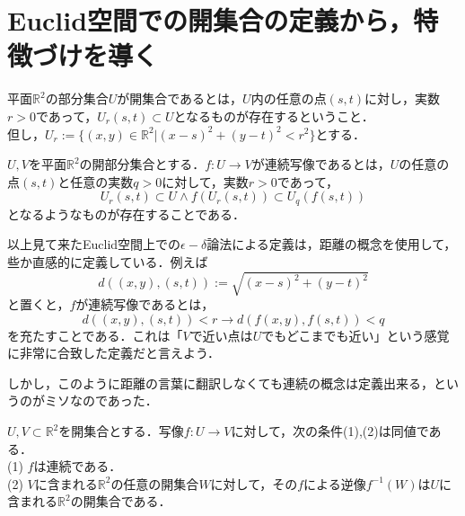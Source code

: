 \documentclass[uplatex, dvipdfmx]{jsreport}
\begin{document}
\section{Euclid空間での開集合の定義から，特徴づけを導く}

\begin{shadebox}\begin{definition}
    平面$\mathbb{R}^2$の部分集合$U$が開集合であるとは，$U$内の任意の点$(s,t)$に対し，実数$r>0$であって，$U_r(s,t)\subset U$となるものが存在するということ．\\
    但し，$U_r := \{ (x,y)\in\mathbb{R}^2 | (x-s)^2 + (y-t)^2 < r^2 \}$とする．
\end{definition}\end{shadebox}

\begin{shadebox}\begin{definition}
    $U,V$を平面$\mathbb{R}^2$の開部分集合とする．$f:U\rightarrow V$が連続写像であるとは，$U$の任意の点$(s,t)$と任意の実数$q>0$に対して，実数$r>0$であって，$$U_r(s,t)\subset U \wedge f(U_r(s,t))\subset U_q(f(s,t))$$となるようなものが存在することである．
\end{definition}\end{shadebox}

以上見て来たEuclid空間上での$\epsilon -\delta$論法による定義は，距離の概念を使用して，些か直感的に定義している．例えば$$d((x,y),(s,t)):=\sqrt{(x-s)^2+(y-t)^2}$$と置くと，$f$が連続写像であるとは，$$d((x,y),(s,t))<r\rightarrow d(f(x,y),f(s,t))<q$$を充たすことである．これは「$V$で近い点は$U$でもどこまでも近い」という感覚に非常に合致した定義だと言えよう．\par
しかし，このように距離の言葉に翻訳しなくても連続の概念は定義出来る，というのがミソなのであった．

\begin{shadebox}\begin{definition}[連続写像の特徴付け]
    $U,V\subset\mathbb{R}^2$を開集合とする．写像$f:U\rightarrow V$に対して，次の条件(1),(2)は同値である．\\
    (1) $f$は連続である．\\
    (2) $V$に含まれる$\mathbb{R}^2$の任意の開集合$W$に対して，その$f$による逆像$f^{-1}(W)$は$U$に含まれる$\mathbb{R}^2$の開集合である．
\end{definition}\end{shadebox}
\end{document}
